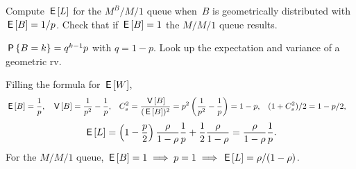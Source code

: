 \documentclass[queueing-book.tex]{subfiles}
\begin{document}
\begin{exercise}\label{ex:l-168}
Compute $\E\L$ for the $M^{B}/M/1$ queue when~$B$ is geometrically distributed with $\E B = 1/p$.
Check that if $\E B =1$ the $M/M/1$ queue results.
\begin{hint}
$\P{B=k}=q^{k-1}p$ with $q=1-p$. Look up the expectation and variance of a geometric rv.
\end{hint}
\begin{solution}
Filling the formula for $\E W$,
 \begin{align*}
 \E B &= \frac 1 p, &  \V B &= \frac1{p^2}-\frac1p, &  C_s^2&= \frac{\V B}{(\E B)^2} = p^2 \left(\frac1{p^2}-\frac1p\right)=1-p, &
 (1+C_s^2)/2 &= 1-p/2,
\end{align*}
\begin{equation*}
\E \L =
\left(1-\frac p2\right) \frac\rho{1-\rho} \frac 1 p + \frac12\frac\rho{1-\rho}
=\frac\rho{1-\rho} \frac 1 p.
\end{equation*}
For the $M/M/1$ queue, $\E B = 1 \implies p = 1 \implies \E\L=\rho/(1-\rho)$.

\end{solution}
\end{exercise}
\end{document}
